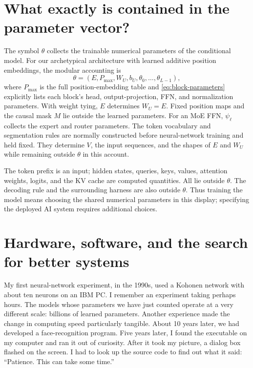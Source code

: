 \documentclass[11pt,twoside]{article}
\theoremstyle{plain}
\theoremstyle{definition}
\theoremstyle{remark}
\begin{document}
\section{What exactly is contained in the parameter vector?}

The symbol $\theta$ collects the trainable numerical parameters of the
conditional model. For our archetypical architecture with learned additive
position embeddings, the modular accounting is
\begin{equation}
\theta=(E,P_{\max},W_U,b_U,\theta_0,\ldots,\theta_{L-1}),
\end{equation}
where $P_{\max}$ is the full position-embedding table and
\eqref{eq:block-parameters} explicitly lists each block's head,
output-projection, FFN, and normalization parameters.
With weight tying, $E$ determines $W_U=E$. Fixed position maps and the
causal mask $M$ lie outside the learned parameters. For an MoE FFN,
$\psi_\ell$ collects the expert and router parameters. The
token vocabulary and segmentation rules are normally constructed before
neural-network training and held fixed. They determine $V$, the input
sequences, and the shapes of $E$ and $W_U$ while remaining outside $\theta$ in
this account.

The token prefix is an input; hidden states, queries, keys, values, attention
weights, logits, and the KV cache are computed quantities. All lie outside
$\theta$. The
decoding rule and the surrounding harness are also outside $\theta$. Thus
training the model means choosing the shared numerical parameters in this
display; specifying the deployed AI system requires additional choices.

\section{Hardware, software, and the search for better systems}
\label{sec:hardware-software}

My first neural-network experiment, in the 1990s, used a Kohonen network with
about ten neurons on an IBM PC. I remember an experiment taking perhaps hours.
The models whose parameters we have just counted operate at a very different
scale: billions of learned parameters. Another experience made the change in
computing speed particularly tangible. About 10 years later,
we had developed a face-recognition
program. Five years later, I found the executable on my computer and ran it
out of curiosity. After it took my picture, a dialog box flashed on the screen.
I had to look up the source code to find out what it said:
``Patience. This can take some time.''
\end{document}
